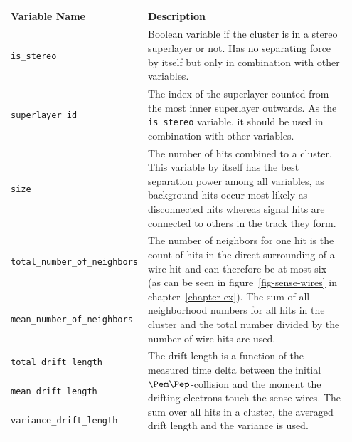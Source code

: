 \begin{table}
  \centering
  \begin{tabular}{p{0.35\linewidth}p{0.60\linewidth}} \toprule
   Variable Name & Description \\ \midrule
   \verb+is_stereo+ & Boolean variable if the cluster is in a stereo superlayer or not. Has no separating force by itself but only in combination with other variables. \\ \midrule 
   \verb+superlayer_id+ & The index of the superlayer counted from the most inner superlayer outwards. As the \verb+is_stereo+ variable, it should be used in combination with other variables.\\ \midrule 
   
   \verb+size+ & The number of hits combined to a cluster. This variable by itself has the best separation power among all variables, as background hits occur most likely as disconnected hits whereas signal hits are connected to others in the track they form.  \\ \midrule 
   
   \verb+total_number_of_neighbors+ & \multirow{2}{*}[-1.5pt]{\begin{minipage}{\linewidth} The number of neighbors for one hit is the count of hits in the direct surrounding of a wire hit and can therefore be at most six (as can be seen in figure~\ref{fig-sense-wires} in chapter~\ref{chapter-ex}). The sum of all neighborhood numbers for all hits in the cluster and the total number divided by the number of wire hits are used. \end{minipage}} \\[5ex] \cmidrule{1-1}
   \verb+mean_number_of_neighbors+ & \\[5ex] \midrule 
   
   \verb+total_drift_length+ & \multirow{3}{*}[-1.5pt]{\begin{minipage}{\linewidth} The drift length is a function of the measured time delta between the initial $\Pem\Pep$-collision and the moment the drifting electrons touch the sense wires. The sum over all hits in a cluster, the averaged drift length and the variance is used. \end{minipage}} \\[1ex] \cmidrule{1-1}
   \verb+mean_drift_length+ & \\[1ex] \cmidrule{1-1}
   \verb+variance_drift_length+ & \\[1ex] \midrule 
   

\end{tabular}
\end{table}
